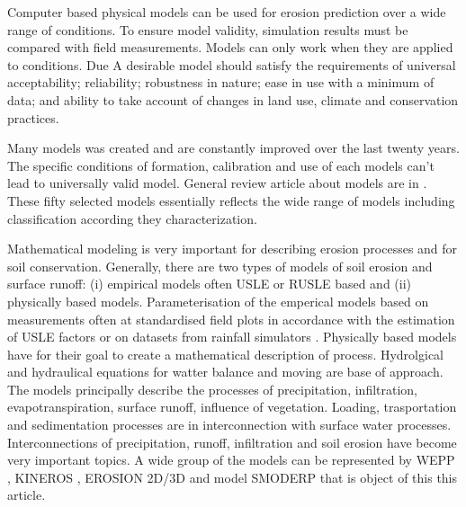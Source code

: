 Computer based physical models can be used for erosion prediction over a wide range of conditions. To ensure model validity, simulation results must be compared with field measurements. Models can only work when they are applied to conditions. Due A desirable model should satisfy the requirements of universal acceptability; reliability; robustness in nature; ease in use with a minimum of data; and ability to take account of changes in land use, climate and conservation practices.

Many models was created and are constantly improved over the last twenty years. The specific conditions of formation, calibration and use of each models can't lead to universally valid model. General review article about models are in \cite{Pandey2016}. These fifty selected models essentially reflects the wide range of models including classification according they characterization.

Mathematical modeling is very important for describing erosion processes and for soil conservation. Generally, there are two types of models of soil erosion and surface runoff: (i) empirical models often USLE \citep{Wischmeier1978} or RUSLE \citep{Renard1991} based and (ii) physically based models. Parameterisation of the emperical models based on measurements often at standardised field plots in accordance with the estimation of USLE factors or on datasets from rainfall simulators \citep{Davidova2016}. 
Physically based models have for their goal to create a mathematical description of  process. Hydrolgical and hydraulical equations for watter balance and moving are base of approach. The models principally describe the processes of precipitation, infiltration, evapotranspiration, surface runoff, influence of vegetation. Loading, trasportation and sedimentation processes are in interconnection with surface water processes. Interconnections of precipitation, runoff, infiltration and soil erosion have become very important topics. A wide group of the models can be represented by WEPP \citep{Laflen1997}, KINEROS \citep{Woolhiser1989}, EROSION 2D/3D \citep{Schindewolf2012a} and model SMODERP that is object of this this article.